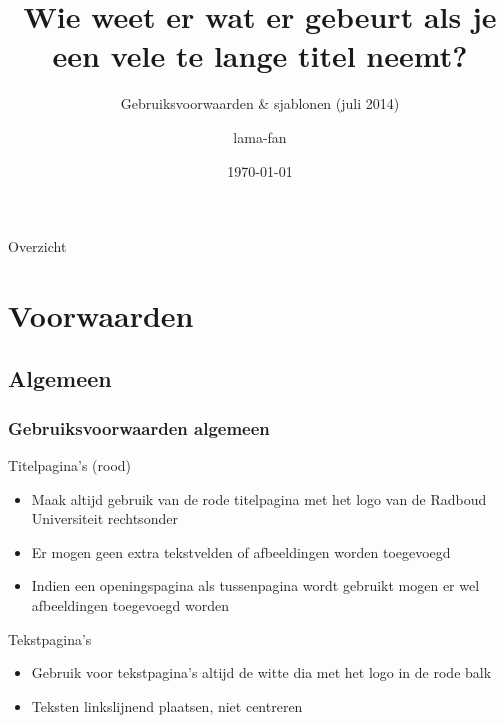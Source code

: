 \documentclass[department=hlcs, notes={hide notes}, slidesperpage=4, handout, official=true]{beamerruhuisstijl}
\title{Wie weet er wat er gebeurt als je een vele te lange titel neemt?}
\subtitle{Gebruiksvoorwaarden \& sjablonen (juli 2014)}
\date{\today}
\author{lama-fan}
\begin{document}
\begin{frame}
    \titlepage
\end{frame}

\begin{frame}{Overzicht}
    \tableofcontents
\end{frame}

\section{Voorwaarden}
\subsection{Algemeen}
\begin{frame}
    \frametitle{Gebruiksvoorwaarden algemeen}

    \begin{block}{Titelpagina's (rood)}
        \begin{itemize}
            \item Maak altijd gebruik van de rode titelpagina met het logo van de Radboud Universiteit rechtsonder
            \item Er mogen geen extra tekstvelden of afbeeldingen worden toegevoegd
            \item Indien een openingspagina als tussenpagina wordt gebruikt mogen er wel afbeeldingen toegevoegd worden
        \end{itemize}
    \end{block}

    \begin{block}{Tekstpagina's}
        \begin{itemize}
            \item Gebruik voor tekstpagina's altijd de witte dia met het logo in de rode balk
            \item Teksten linkslijnend plaatsen, niet centreren
        \end{itemize}
    \end{block}
\end{frame} 
\end{document}
